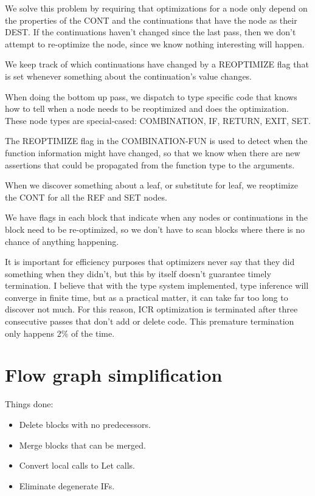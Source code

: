 We solve this problem by requiring that optimizations for a node only depend on
the properties of the CONT and the continuations that have the node as their
DEST.  If the continuations haven't changed since the last pass, then we don't
attempt to re-optimize the node, since we know nothing interesting will happen.

We keep track of which continuations have changed by a REOPTIMIZE flag that is
set whenever something about the continuation's value changes.

When doing the bottom up pass, we dispatch to type specific code that knows how
to tell when a node needs to be reoptimized and does the optimization.  These
node types are special-cased: COMBINATION, IF, RETURN, EXIT, SET.

The REOPTIMIZE flag in the COMBINATION-FUN is used to detect when the function
information might have changed, so that we know when there are new assertions
that could be propagated from the function type to the arguments.

When we discover something about a leaf, or substitute for leaf, we reoptimize
the CONT for all the REF and SET nodes. 

We have flags in each block that indicate when any nodes or continuations in
the block need to be re-optimized, so we don't have to scan blocks where there
is no chance of anything happening.

It is important for efficiency purposes that optimizers never say that they did
something when they didn't, but this by itself doesn't guarantee timely
termination.  I believe that with the type system implemented, type inference
will converge in finite time, but as a practical matter, it can take far too
long to discover not much.  For this reason, ICR optimization is terminated
after three consecutive passes that don't add or delete code.  This premature
termination only happens 2\% of the time.

\section{Flow graph simplification}

Things done:

\begin{itemize}
\item Delete blocks with no predecessors.
\item Merge blocks that can be merged.
\item Convert local calls to Let calls.
\item Eliminate degenerate IFs.
\end{itemize}

